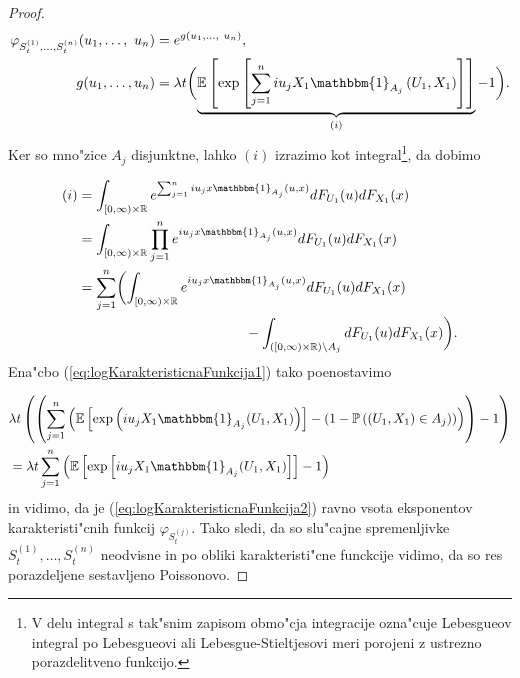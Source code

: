 \documentclass[12pt, a4paper, reqno]{amsart}
\theoremstyle{definition}
\theoremstyle{plain}
\newcommand{\R}{\mathbb{R}}
\newcommand{\E}{\mathbb{E}}
\newcommand{\Prob}{\mathbb{P}}
\newcommand{\1}{\mathds{1}}
\begin{document}
\begin{proof}
            \begin{align}
                    \varphi_{S_t^{(1)},\dots, S_t^{(n)}}(u_1, \dots, \ u_n) &= e^{g(u_1, \dots, \ u_n)}, \nonumber \\
                    g(u_1, \dots, u_n) &= \lambda t \biggl(\underbrace{\E\left[\exp\left[\sum_{j = 1}^niu_jX_1\mathbbm{1}_{A_j}\left(U_1, X_1\right)\right]\right]}_{(i)} - 1\biggr). \label{eq:logKarakteristicnaFunkcija1}
            \end{align}
            Ker so mno"zice $A_j$ disjunktne, lahko $(i)$ izrazimo kot integral\footnote{V delu 
            integral s tak"snim zapisom obmo"cja integracije ozna"cuje Lebesgueov integral po Lebesgueovi 
            ali Lebesgue-Stieltjesovi meri porojeni z ustrezno porazdelitveno funkcijo.}, da dobimo

            \begin{align*}
                (i) &= \int_{[0, \infty)\times\R}e^{\sum_{j = 1}^niu_jx\mathbbm{1}_{A_j}(u, x)}dF_{U_1}(u)dF_{X_1}(x)\\
                    &= \int_{[0, \infty)\times\R}\prod_{j = 1}^ne^{iu_jx\mathbbm{1}_{A_j}(u, x)}dF_{U_1}(u)dF_{X_1}(x)\\
                    &= \sum_{j=1}^n\biggl(\int_{[0, \infty)\times\R}e^{iu_jx\mathbbm{1}_{A_j}(u, x)}dF_{U_1}(u)dF_{X_1}(x)  \\
                    & \qquad \qquad \qquad \qquad \qquad \qquad  - \int_{([0, \infty)\times\R) \setminus A_j}dF_{U_1}(u)dF_{X_1}(x)\biggr).\\
            \end{align*}
            Ena"cbo (\ref{eq:logKarakteristicnaFunkcija1}) tako poenostavimo

            \begin{align}
                    &\lambda t \left(\left(\sum_{j=1}^n\left(\E\left[\exp\left(iu_j X_1 \mathbbm{1}_{A_j}(U_1, X_1)\right)\right] - \left( 1 - \Prob\left((U_1, X_1) \in A_j\right)\right)\right)\right) - 1\right)\nonumber \\
                    &= \lambda t \sum_{j=1}^n\left(\E\left[\exp\left[iu_jX_1\mathbbm{1}_{A_j}(U_1, X_1)\right]\right] - 1\right) \label{eq:logKarakteristicnaFunkcija2}
            \end{align} 
            in vidimo, da je (\ref{eq:logKarakteristicnaFunkcija2}) ravno vsota eksponentov karakteristi"cnih funkcij $\varphi_{S_t^{(j)}}$. 
            Tako sledi, da so slu"cajne spremenljivke $S_t^{(1)}, \dots, S_t^{(n)}$ neodvisne in po obliki karakteristi"cne 
            funckcije vidimo, da so res porazdeljene sestavljeno Poissonovo.
        \end{proof}
\end{document}
